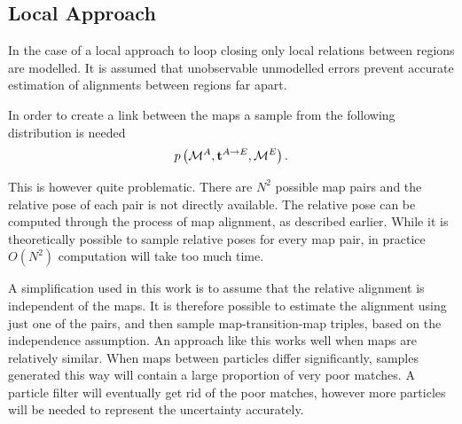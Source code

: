 \subsection{Local Approach}

In the case of a local approach to loop closing only local relations
between regions are modelled. It is assumed that unobservable
unmodelled errors prevent accurate estimation of alignments between
regions far apart.

In order to create a link between the maps a sample from the following
distribution is needed
$$
\prob{\mapA,\tr{}{A}{E},\mapE}. 
$$

This is however quite problematic. There are $N^2$ possible map pairs
and the relative pose of each pair is not directly available. The
relative pose can be computed through the process of map alignment, as
described earlier. While it is theoretically possible to sample relative
poses for every map pair, in practice $O(N^2)$ computation will take too
much time.

A simplification used in this work is to assume that the relative
alignment is independent of the maps. It is therefore possible to
estimate the alignment using just one of the pairs, and then sample
map-transition-map triples, based on the independence assumption. An
approach like this works well when maps are relatively similar. When
maps between particles differ significantly, samples generated this way
will contain a large proportion of very poor matches. A particle filter
will eventually get rid of the poor matches, however more particles will
be needed to represent the uncertainty accurately.



